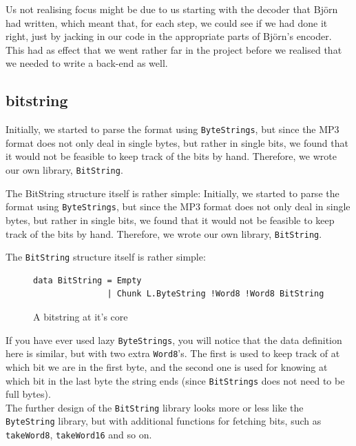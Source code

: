 \documentclass[a4paper,12pt]{article}
\begin{document}
        Us not realising focus might be due to us starting with the decoder that
        Björn had written, which meant that, for each step, we could see if we
        had done it right, just by jacking in our code in the appropriate parts
        of Björn's encoder. This had as effect that we went rather far in the
        project before we realised that we needed to write a back-end as well.

    \subsection{bitstring}
    \label{sec:bitstring}
        Initially, we started to parse the format using \texttt{ByteStrings},
        but since the MP3 format does not only deal in single bytes, but rather
        in single bits, we found that it would not be feasible to keep track of
        the bits by hand. Therefore, we wrote our own library,
        \texttt{BitString}.

        The BitString structure itself is rather simple:
        Initially, we started to parse the format using \texttt{ByteStrings},
        but since the MP3 format does not only deal in single bytes, but rather
        in single bits, we found that it would not be feasible to keep track of
        the bits by hand. Therefore, we wrote our own library,
        \texttt{BitString}.

        The \texttt{BitString} structure itself is rather simple:
\begin{figure}[h]
  \begin{center}
        \begin{lstlisting}
data BitString = Empty
               | Chunk L.ByteString !Word8 !Word8 BitString
        \end{lstlisting}
    \caption{A bitstring at it's core}\label{fig:bitstring}
  \end{center}
\end{figure}

        If you have ever used lazy \texttt{ByteStrings}, you will notice that
        the data definition here is similar, but with two extra
        \texttt{Word8}'s. The first is used to keep track of at which bit we are
        in the first byte, and the second one is used for knowing at which bit
        in the last byte the string ends (since \texttt{BitStrings} does not
        need to be full bytes). \\ The further design of the \texttt{BitString}
        library looks more or less like the \texttt{ByteString} library, but
        with additional functions for fetching bits, such as \texttt{takeWord8},
        \texttt{takeWord16} and so on. \\
\end{document}
